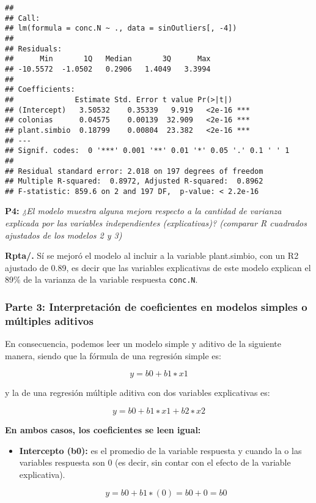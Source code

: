 \documentclass[
]{article}
\begin{document}
\begin{verbatim}
## 
## Call:
## lm(formula = conc.N ~ ., data = sinOutliers[, -4])
## 
## Residuals:
##      Min       1Q   Median       3Q      Max 
## -10.5572  -1.0502   0.2906   1.4049   3.3994 
## 
## Coefficients:
##              Estimate Std. Error t value Pr(>|t|)    
## (Intercept)   3.50532    0.35339   9.919   <2e-16 ***
## colonias      0.04575    0.00139  32.909   <2e-16 ***
## plant.simbio  0.18799    0.00804  23.382   <2e-16 ***
## ---
## Signif. codes:  0 '***' 0.001 '**' 0.01 '*' 0.05 '.' 0.1 ' ' 1
## 
## Residual standard error: 2.018 on 197 degrees of freedom
## Multiple R-squared:  0.8972, Adjusted R-squared:  0.8962 
## F-statistic: 859.6 on 2 and 197 DF,  p-value: < 2.2e-16
\end{verbatim}

\textbf{P4:} \emph{¿El modelo muestra alguna mejora respecto a la
cantidad de varianza explicada por las variables independientes
(explicativas)? (comparar R cuadrados ajustados de los modelos 2 y 3)}

\textbf{Rpta/.} Sí se mejoró el modelo al incluir a la variable
plant.simbio, con un R2 ajustado de 0.89, es decir que las variables
explicativas de este modelo explican el 89\% de la varianza de la
variable respuesta \texttt{conc.N}.

\hypertarget{parte-3-interpretaciuxf3n-de-coeficientes-en-modelos-simples-o-muxfaltiples-aditivos}{%
\subsubsection{\texorpdfstring{\textbf{Parte 3: Interpretación de
coeficientes en modelos simples o múltiples
aditivos}}{Parte 3: Interpretación de coeficientes en modelos simples o múltiples aditivos}}\label{parte-3-interpretaciuxf3n-de-coeficientes-en-modelos-simples-o-muxfaltiples-aditivos}}

En consecuencia, podemos leer un modelo simple y aditivo de la siguiente
manera, siendo que la fórmula de una regresión simple es:

\[
y=b0+b1∗x1
\]

y la de una regresión múltiple aditiva con dos variables explicativas
es:

\[
y=b0+b1∗x1+b2∗x2
\]

\textbf{En ambos casos, los coeficientes se leen igual:}

\begin{itemize}
\item
  \textbf{Intercepto (b0):} es el promedio de la variable respuesta y
  cuando la o las variables respuesta son 0 (es decir, sin contar con el
  efecto de la variable explicativa).

  \[
  y=b0+b1∗(0) = b0+0 = b0  
  \]
\end{itemize}
\end{document}
